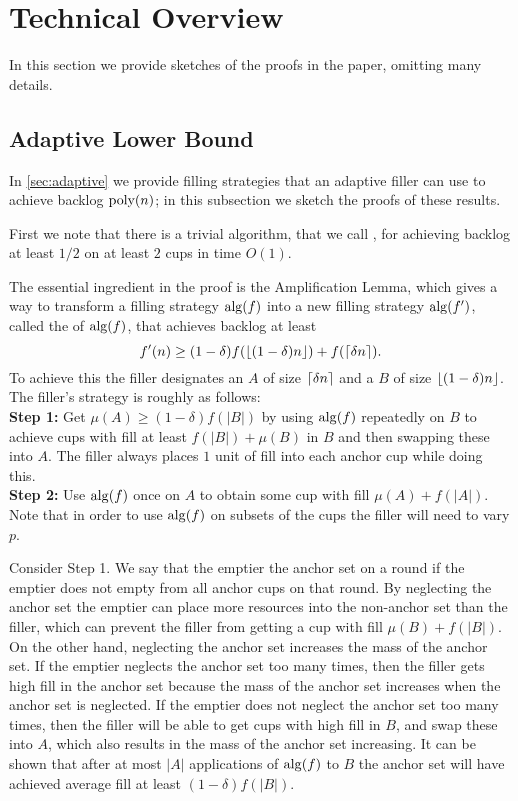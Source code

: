 \section{Technical Overview}
\label{sec:technical_overview}

In this section we provide sketches of the proofs in the paper,
omitting many details.

\subsection{Adaptive Lower Bound}
In \cref{sec:adaptive} we provide filling strategies that an
adaptive filler can use to achieve backlog $\operatorname{\text{poly}}(n)$; in this
subsection we sketch the proofs of these results.

First we note that there is a trivial algorithm, that we call
, for achieving backlog at least $1/2$ on at
least $2$ cups in time $O(1)$.

The essential ingredient in the proof is the Amplification
Lemma, which gives a way to transform a filling strategy
$\operatorname{\text{\textup{alg}}}(f)$ into a new filling strategy $\operatorname{\text{\textup{alg}}}(f')$, called the
 of $\operatorname{\text{\textup{alg}}}(f)$, that achieves backlog at
least 
$$f'(n) \ge (1-\delta) f(\left\lfloor (1-\delta)n \right\rfloor) + f(\left\lceil \delta
n \right\rceil).$$
To achieve this the filler designates an  $A$ of size
$\left\lceil \delta n \right\rceil$ and a  $B$ of size
$\left\lfloor (1-\delta)n \right\rfloor$. The filler's strategy is roughly as follows:\\
\textbf{Step 1:} Get $\mu(A) \ge (1-\delta) f(|B|)$ by using $\operatorname{\text{\textup{alg}}}(f)$ repeatedly
on $B$ to achieve cups with fill at least $f(|B|)+\mu(B)$ in $B$ and
then swapping these into $A$. The filler always places $1$ unit
of fill into each anchor cup while doing this.\\
\textbf{Step 2:} Use $\operatorname{\text{\textup{alg}}}(f)$ once on $A$ to obtain some cup
with fill $\mu(A)+f(|A|)$.\\
Note that in order to use $\operatorname{\text{\textup{alg}}}(f)$ on subsets of the cups the
filler will need to vary $p$.

Consider Step 1. We say that the emptier  the
anchor set on a round if the emptier does not empty from all
anchor cups on that round. By neglecting the anchor set the
emptier can place more resources into the non-anchor set than the
filler, which can prevent the filler from getting a cup with fill
$\mu(B) + f(|B|)$. On the other hand, neglecting the anchor set
increases the mass of the anchor set. If the emptier neglects the
anchor set too many times, then the filler gets high fill in the
anchor set because the mass of the anchor set increases when the
anchor set is neglected. If the emptier does not neglect the
anchor set too many times, then the filler will be able to get
cups with high fill in $B$, and swap these into $A$, which also
results in the mass of the anchor set increasing. It can be shown
that after at most $|A|$ applications of $\operatorname{\text{\textup{alg}}}(f)$ to $B$ the
anchor set will have achieved average fill at least $(1-\delta)
f(|B|)$.

